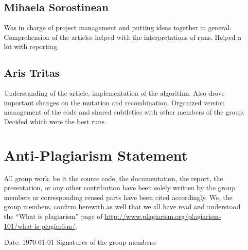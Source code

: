 \documentclass{article}
\begin{document}
\subsection*{Mihaela Sorostinean}
Was in charge of project management and putting ideas together in general.
Comprehension of the articles helped with the interpretations of runs. 
Helped a lot with reporting.

\subsection*{Aris Tritas}
Understanding of the article, implementation of the algorithm. Also drove important changes on the mutation and recombination. Organized version management of the code and shared subtleties with other members of the group. Decided which were the best runs.

\section{Anti-Plagiarism Statement}
All group work, be it the source code, the documentation, the report, the presentation, or any other contribution have been solely written by the group members or corresponding reused parts have been cited accordingly. We, the group members, confirm herewith as well that we all have read and understood the ``What is plagiarism'' page of \url{http://www.plagiarism.org/plagiarism-101/what-is-plagiarism/}.

Date: \today \newline
Signatures of the group members:
\end{document}
